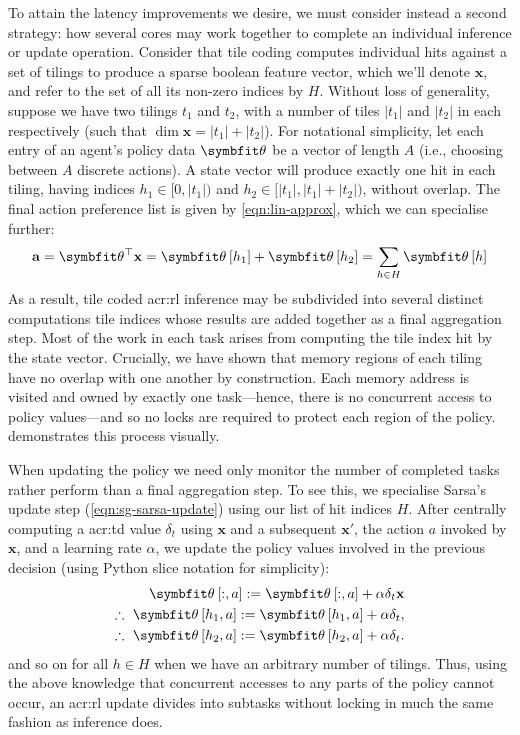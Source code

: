 To attain the latency improvements we desire, we must consider instead a second strategy: how several cores may work together to complete an individual inference or update operation.
Consider that tile coding computes individual hits against a set of tilings to produce a sparse boolean feature vector, which we'll denote $\mathbf{x}$, and refer to the set of all its non-zero indices by $H$.
Without loss of generality, suppose we have two tilings $t_1$ and $t_2$, with a number of tiles $|t_1|$ and $|t_2|$ in each respectively (such that $\dim{\mathbf{x}}=|t_1|+|t_2|$).
For notational simplicity, let each entry of an agent's policy data $\wvec{}$ be a vector of length $A$ (i.e., choosing between $A$ discrete actions).
A state vector will produce exactly one hit in each tiling, having indices $h_1\in[0,|t_1|)$ and $h_2\in[|t_1|,|t_1|+|t_2|)$, without overlap.
The final action preference list is given by \cref{eqn:lin-approx}, which we can specialise further:
$$
\mathbf{a} = \wvec{}^{\top} \mathbf{x} = \wvec{}\left[h_1\right] + \wvec{}\left[h_2\right] = \sum_{h\in{}H}\wvec{}\left[h\right]
$$
As a result, tile coded \gls{acr:rl} inference may be subdivided into several distinct computations tile indices whose results are added together as a final aggregation step.
Most of the work in each task arises from computing the tile index hit by the state vector.
Crucially, we have shown that memory regions of each tiling have no overlap with one another by construction.
Each memory address is visited and owned by exactly one task---hence, there is no concurrent access to policy values---and so no locks are required to protect each region of the policy.
 demonstrates this process visually.

When updating the policy we need only monitor the number of completed tasks rather perform than a final aggregation step.
To see this, we specialise Sarsa's update step (\cref{eqn:sg-sarsa-update}) using our list of hit indices $H$.
After centrally computing a \gls{acr:td} value $\delta_t$ using $\mathbf{x}$ and a subsequent $\mathbf{x}'$, the action $a$ invoked by $\mathbf{x}$, and a learning rate $\alpha$, we update the policy values involved in the previous decision (using Python slice notation for simplicity):
\begin{align*}
\wvec{}\left[:,a\right] := \wvec{}\left[:,a\right] + \alpha\delta_t \mathbf{x}\\
\therefore~\wvec{}\left[h_1,a\right] := \wvec{}\left[h_1,a\right] + \alpha\delta_t,\\
\therefore~\wvec{}\left[h_2,a\right] := \wvec{}\left[h_2,a\right] + \alpha\delta_t.
\end{align*}
and so on for all $h \in H$ when we have an arbitrary number of tilings.
Thus, using the above knowledge that concurrent accesses to any parts of the policy cannot occur, an \gls{acr:rl} update divides into subtasks without locking in much the same fashion as inference does.

